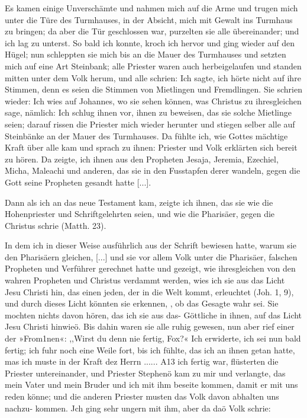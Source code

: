 Es kamen einige Unverschämte und nahmen mich auf die
Arme und trugen mich unter die Türe des Turmhauses, in der
Absicht, mich mit Gewalt ins Turmhaus zu bringen; da aber
die Tür geschlossen war, purzelten sie alle übereinander; und ich
lag zu unterst. So bald ich konnte, kroch ich hervor und ging wieder
auf den Hügel; nun schleppten sie mich bis an die Mauer
des Turmhauses und setzten mich auf eine Art Steinbank; alle
Priester waren auch herbeigelaufen und standen mitten unter dem
Volk herum, und alle schrien:  Ich sagte,
ich hörte nicht auf ihre Stimmen, denn es seien die Stimmen von
Mietlingen und Fremdlingen. Sie schrien wieder:  Ich wies auf Johannes, wo sie sehen können, was
Christus zu ihresgleichen sage, nämlich:  Ich schlug ihnen vor, ihnen zu beweisen,
das sie solche Mietlinge seien; darauf rissen die Priester mich
wieder herunter und stiegen selber alle auf Steinbänke
an der Mauer des Turmhauses. Da fühlte ich, wie Gottes
mächtige Kraft über alle kam und sprach zu ihnen:  Priester und Volk erklärten sich bereit
zu hören. Da zeigte, ich ihnen aus den Propheten Jesaja,
Jeremia, Ezechiel, Micha, Maleachi und anderen, das sie in den
Fusstapfen derer wandeln, gegen die Gott seine Propheten 
gesandt hatte [...].


Dann als ich an das neue Testament kam, zeigte ich ihnen,
das sie wie die Hohenpriester und Schriftgelehrten seien, und
wie die Pharisäer, gegen die Christus  schrie 
(Matth. 23).


In dem ich in dieser Weise ausführlich aus der Schrift bewiesen
hatte, warum sie den Pharisäern gleichen, [...] und sie vor allem
Volk unter die Pharisäer, falschen Propheten und Verführer
gerechnet hatte und gezeigt, wie ihresgleichen von den wahren
Propheten und Christus verdammt werden, wies ich sie aus das
Licht Jesu Christi hin, das einen jeden, der in die Welt kommt,
erleuchtet (Joh. 1, 9), und durch dieses Licht könnten sie erkennen,
, ob das Gesagte wahr sei. Sie mochten nichts davon hören, das
ich sie aus das- Göttliche in ihnen, auf das Licht Jesu Christi
hinwieö. Bis dahin waren sie alle ruhig gewesen, nun aber
rief einer der »From1nen«: ,,Wirst du denn nie fertig, Fox?«
Ich erwiderte, ich sei nun bald fertig; ich fuhr noch eine Weile
fort, bis ich fühlte, das ich an ihnen getan hatte, mas ich muste
in der Kraft dez Herrn ...... A13 ich fertig war, flüsterten
die Priester untereinander, und Priester Stephenö kam zu mir
und verlangte, das mein Vater und mein Bruder und ich mit
ihm beseite kommen, damit er mit uns reden könne; und die
anderen Priester musten das Volk davon abhalten uns nachzu-
kommen. Jch ging sehr ungern mit ihm, aber da daö Volk schrie:


